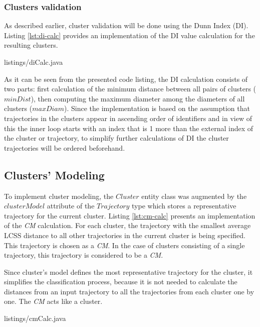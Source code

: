 

\subsubsection{Clusters validation}

As described earlier, cluster validation will be done using the Dunn Index (DI). Listing \ref{lst:di-calc} provides an implementation of the DI value calculation for the resulting clusters.

 {listings/diCalc.java}

As it can be seen from the presented code listing, the DI calculation consists of two parts: first calculation of the minimum distance between all pairs of clusters ($minDist$), then computing the maximum diameter among the diameters of all clusters ($maxDiam$). Since the implementation is based on the assumption that trajectories in the clusters appear in ascending order of identifiers and in view of this the inner loop starts with an index that is 1 more than the external index of the cluster or trajectory, to simplify further calculations of DI the cluster trajectories will be ordered beforehand.

\subsection{Clusters' Modeling}

To implement cluster modeling, the $Cluster$ entity class was augmented by the $clusterModel$ attribute of the $Trajectory$ type which stores a representative trajectory for the current cluster. Listing \ref{lst:cm-calc} presents an implementation of the \textit{CM} calculation. For each cluster, the trajectory with the smallest average LCSS distance to all other trajectories in the current cluster is being specified. This trajectory is chosen as a \textit{CM}. In the case of clusters consisting of a single trajectory, this trajectory is considered to be a \textit{CM}.

Since cluster's model defines the most representative trajectory for the cluster, it simplifies the classification process, because it is not needed to calculate the distances from an input trajectory to all the trajectories from each cluster one by one. The \textit{CM} acts like a cluster.

 {listings/cmCalc.java}

